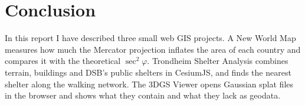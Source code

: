 \section{Conclusion}\label{sec:conclusion}

In this report I have described three small web GIS projects. A New World Map measures how much the Mercator projection inflates the area of each country and compares it with the theoretical $\sec^2\varphi$. Trondheim Shelter Analysis combines terrain, buildings and DSB's public shelters in CesiumJS, and finds the nearest shelter along the walking network. The 3DGS Viewer opens Gaussian splat files in the browser and shows what they contain and what they lack as geodata.
